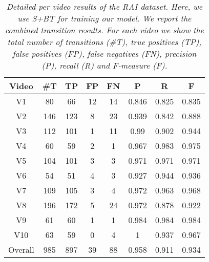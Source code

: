 \documentclass[journal]{IEEEtran}
\begin{document}
\begin{table*}[h]
\small
\centering
\begin{tabular}{|c|c|c|c|c|c|c|c|}
     \hline      
				\textbf{Video} & \textbf{\#T} & \textbf{TP} & \textbf{FP} & \textbf{FN} & \textbf{P} & \textbf{R} & \textbf{F}  \\
			\hline 
				 V1                           & 80	& 66	& 12	& 14	& 0.846	& 0.825	& 0.835 \\ 
				 V2                           &146	&123	&8	&23	&0.939	&0.842	&0.888 \\ 
				 V3                           &112	&101	&1	&11	&0.99	&0.902	&0.944 \\
				 V4                           &60	&59	&2	&1	&0.967	&0.983	&0.975  \\ 
				 V5                           &104	&101	&3	&3	&0.971	&0.971	&0.971 \\ 
				 V6                           &54	&51	&4	&3	&0.927	&0.944	&0.936   \\
				 V7                           &109	&105	&3	&4	&0.972	&0.963	&0.968  \\ 
				 V8                           &196	&172	&5	&24	&0.972	&0.878	&0.922  \\ 
				 V9                           &61	&60	&1	&1	&0.984	&0.984	&0.984  \\
				 V10                          &63	&59	&0	&4	&1	&0.937	&0.967   \\				
			\hline
			 Overall                        &985	&897	&39	&88	&0.958	&0.911	&0.934       \\
			\hline
    \end{tabular}
\caption{\textit{Detailed per video results of the RAI dataset. Here, we use S+BT for training our model. We report the combined transition results. For each video we show the total number of transitions (\#T), true positives (TP), false positives (FP), false negatives (FN), precision (P), recall (R) and F-measure (F).}}
\label{tab:RAI}
\end{table*}
\end{document}
